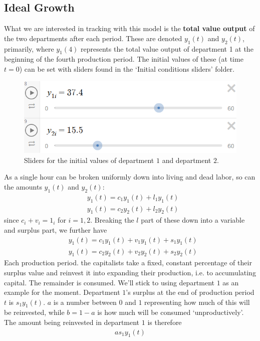 \documentclass{article}
\theoremstyle{theorem}
\begin{document}
\subsection{Ideal Growth}
What we are interested in tracking with this model is the \textbf{total value output} of the two departments after each period. These are denoted $y_1(t)$ and $y_2(t)$, primarily, where $y_1(4)$ represents the total value output of department 1 at the beginning of the fourth production period. The initial values of these (at time $t=0$) can be set with sliders found in the `Initial conditions sliders' folder.
\begin{figure}[H]
\centering
\includegraphics[scale=.5]{Images/initialY}
\caption{Sliders for the initial values of department $1$ and department $2$.}
\end{figure}
As a single hour can be broken uniformly down into living and dead labor, so can the amounts $y_1(t)$ and $y_2(t)$:
\begin{align} 
	& y_1(t) = c_1y_1(t) + l_1y_1(t) \\
	& y_1(t) = c_2y_2(t) + l_2y_2(t) 
\end{align}
since $c_i+v_i = 1_i$ for $i=1,2$. Breaking the $l$ part of these down into a variable and surplus part, we further have 
\begin{align}
	& y_1(t) = c_1y_1(t) + v_1y_1(t) + s_1y_1(t) \\
	& y_1(t) = c_2y_2(t) + v_2y_2(t) + s_2y_2(t)
\end{align} 
Each production period. the capitalists take a fixed, constant percentage of their surplus value and reinvest it into expanding their production, i.e. to accumulating capital. The remainder is consumed. We'll stick to using department $1$ as an example for the moment. Department $1$'s surplus at the end of production period $t$ is $s_1y_1(t)$. $a$ is a number between $0$ and $1$ representing how much of this will be reinvested, while $b=1-a$ is how much will be consumed `unproductively'. The amount being reinvested in department $1$ is therefore 
\begin{align}
	as_1y_1(t) 
\end{align} 
\end{document}
